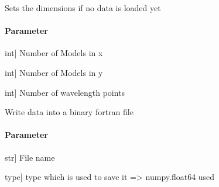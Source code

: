 \documentclass[letterpaper,10pt,english]{sphinxmanual}
\begin{document}
\begin{fulllineitems}

\begin{fulllineitems}
\label{\detokenize{classes:id53}}
\pysigstartsignatures
{}
\pysigstopsignatures
\sphinxAtStartPar
Sets the dimensions if no data is loaded yet


\paragraph{Parameter}
\label{\detokenize{classes:id54}}\begin{description}
\sphinxlineitem{nx}{[}int{]}
\sphinxAtStartPar
Number of Models in x

\sphinxlineitem{ny}{[}int{]}
\sphinxAtStartPar
Number of Models in y

\sphinxlineitem{nw}{[}int{]}
\sphinxAtStartPar
Number of wavelength points

\end{description}

\end{fulllineitems}


\begin{fulllineitems}
\label{\detokenize{classes:id55}}
\pysigstartsignatures
{}
\pysigstopsignatures
\sphinxAtStartPar
Write data into a binary fortran file


\paragraph{Parameter}
\label{\detokenize{classes:id56}}\begin{description}
\sphinxlineitem{fname}{[}str{]}
\sphinxAtStartPar
File name

\sphinxlineitem{fmt\_type}{[}type{]}
\sphinxAtStartPar
type which is used to save it =\textgreater{} numpy.float64 used

\end{description}


\end{fulllineitems}
\end{fulllineitems}
\end{document}

